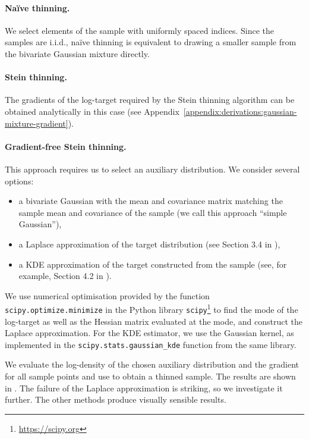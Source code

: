 \documentclass[11pt,a4paper]{report}
\begin{document}
\paragraph{Na\"ive thinning.} We select elements of the sample with uniformly spaced indices. Since the samples are i.i.d., na\"ive thinning is equivalent to drawing a smaller sample from the bivariate Gaussian mixture directly.

\paragraph{Stein thinning.} The gradients of the log-target required by the Stein thinning algorithm can be obtained analytically in this case (see Appendix~\ref{appendix:derivations:gaussian-mixture-gradient}).

\paragraph{Gradient-free Stein thinning.} This approach requires us to select an auxiliary distribution. We consider several options:
\begin{itemize}
\item a bivariate Gaussian with the mean and covariance matrix matching the sample mean and covariance of the sample (we call this approach ``simple Gaussian''),
\item a Laplace approximation of the target distribution (see Section 3.4 in \cite{robertMonteCarloStatistical2004}),
\item a KDE approximation of the target constructed from the sample (see, for example, Section 4.2 in \cite{ruppertStatisticsDataAnalysis2015}).
\end{itemize}

We use numerical optimisation provided by the function \texttt{scipy.\allowbreak optimize.\allowbreak minimize} in the Python library \texttt{scipy}\footnote{\url{https://scipy.org}} to find the mode of the log-target as well as the Hessian matrix evaluated at the mode, and construct the Laplace approximation.
For the KDE estimator, we use the Gaussian kernel, as implemented in the \texttt{scipy.\allowbreak stats.\allowbreak gaussian\_kde} function from the same library.

We evaluate the log-density of the chosen auxiliary distribution and the gradient for all sample points and use  to obtain a thinned sample. The results are shown in . The failure of the Laplace approximation is striking, so we investigate it further. The other methods produce visually sensible results.
\end{document}
